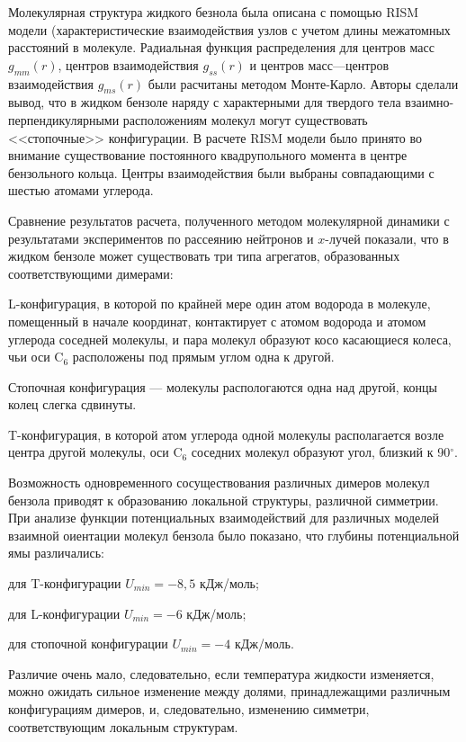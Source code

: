 Молекулярная структура жидкого безнола была описана с помощью RISM модели (характеристические взаимодействия узлов с учетом длины межатомных расстояний в молекуле.
Радиальная функция распределения для центров масс $g_{mm}(r)$, центров взаимодействия $g_{ss}(r)$ и центров масс---центров взаимодействия $g_{ms}(r)$ были расчитаны методом Монте-Карло.
Авторы сделали вывод, что в жидком бензоле наряду с характерными для твердого тела взаимно-перпендикулярными расположениям молекул могут существовать <<стопочные>> конфигурации.
В расчете RISM модели было принято во внимание существование постоянного квадрупольного момента в центре бензольного кольца. Центры взаимодействия были выбраны совпадающими с шестью атомами углерода.

Сравнение результатов расчета, полученного методом молекулярной динамики с результатами экспериментов по рассеянию нейтронов и $x$-лучей показали, что в жидком бензоле может существовать три типа агрегатов, образованных соответствующими димерами:

L-конфигурация, в которой по крайней мере один атом водорода в молекуле, помещенный в начале координат, контактирует
с атомом водорода и атомом углерода соседней молекулы, и пара молекул образуют косо касающиеся колеса, чьи оси C$_6$ расположены под прямым углом одна к другой.

Стопочная конфигурация --- молекулы распологаются одна над другой, концы колец слегка сдвинуты.

T-конфигурация, в которой атом углерода одной молекулы располагается возле центра другой молекулы, оси C$_6$ соседних
молекул образуют угол, близкий к 90$^{\circ}$.

Возможность одновременного сосуществования различных димеров молекул бензола приводят к образованию локальной структуры,
различной симметрии. 
При анализе функции потенциальных взаимодействий для различных моделей взаимной оиентации молекул бензола было показано, что глубины потенциальной ямы различались:

для T-конфигурации $ U_{min}= -8,5$ кДж/моль;

для L-конфигурации $ U_{min}= -6$ кДж/моль;

для стопочной конфигурации $ U_{min}= -4$ кДж/моль.

Различие очень мало, следовательно, если температура жидкости изменяется, можно ожидать сильное изменение между долями,
принадлежащими различным конфигурациям димеров, и, следовательно, изменению симметри, соответствующим локальным структурам.

